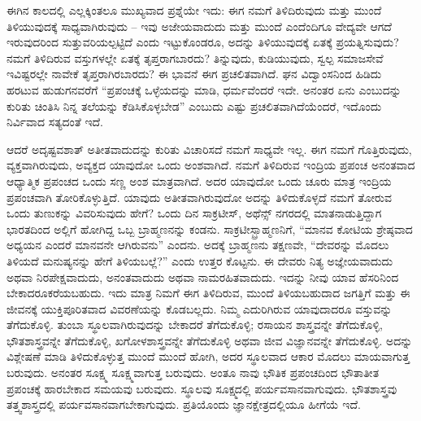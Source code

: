 ಈಗಿನ ಕಾಲದಲ್ಲಿ ಎಲ್ಲಕ್ಕಿಂತಲೂ ಮುಖ್ಯವಾದ ಪ್ರಶ್ನೆಯೇ ಇದು: ಈಗ ನಮಗೆ ತಿಳಿದಿರುವುದು ಮತ್ತು ಮುಂದೆ ತಿಳಿಯುವುದಕ್ಕೆ ಸಾಧ್ಯವಾಗಿರುವುದು – ಇವು ಅಜೇಯ\-ವಾದುದು ಮತ್ತು ಮುಂದೆ ಎಂದೆಂದಿಗೂ ವೇದ್ಯವೇ ಆಗದೆ ಇರುವುದರಿಂದ ಸುತ್ತುವರಿಯಲ್ಪಟ್ಟಿದೆ ಎಂದು ಇಟ್ಟುಕೊಂಡರೂ, ಅದನ್ನು ತಿಳಿಯುವುದಕ್ಕೆ ಏತಕ್ಕೆ ಪ್ರಯತ್ನಿಸುವುದು? ನಮಗೆ ತಿಳಿದಿರುವ ವಸ್ತುಗಳಲ್ಲೇ ಏತಕ್ಕೆ ತೃಪ್ತರಾಗಬಾರದು? ತಿನ್ನುವುದು, ಕುಡಿಯುವುದು, ಸ್ವಲ್ಪ ಸಮಾಜಸೇವೆ ಇವಿಷ್ಟರಲ್ಲೇ ನಾವೇಕೆ ತೃಪ್ತರಾಗಿರಬಾರದು? ಈ ಭಾವನೆ ಈಗ ಪ್ರಚಲಿತವಾಗಿದೆ. ಘನ ವಿದ್ವಾಂಸನಿಂದ ಹಿಡಿದು ಹರಟುವ ಹುಡುಗನವರೆಗೆ “ಪ್ರಪಂಚಕ್ಕೆ ಒಳ್ಳೆಯದನ್ನು ಮಾಡಿ, ಧರ್ಮವೆಂದರೆ ಇದೇ. ಅನಂತರ ಏನು ಎಂಬುದನ್ನು ಕುರಿತು ಚಿಂತಿಸಿ ನಿನ್ನ ತಲೆಯನ್ನು ಕೆಡಿಸಿಕೊಳ್ಳಬೇಡ” ಎಂಬುದು ಎಷ್ಟು ಪ್ರಚಲಿತವಾಗಿದೆಯೆಂದರೆ, ಇದೊಂದು ನಿರ್ವಿವಾದ ಸತ್ಯದಂತೆ ಇದೆ.

ಆದರೆ ಅದೃಷ್ಟವಶಾತ್ ಅತೀತವಾದುದನ್ನು ಕುರಿತು ವಿಚಾರಿಸದೆ ನಮಗೆ ಸಾಧ್ಯವೇ ಇಲ್ಲ. ಈಗ ನಮಗೆ ಗೊತ್ತಿರುವುದು, ವ್ಯಕ್ತವಾಗಿರುವುದು, ಅವ್ಯಕ್ತದ ಯಾವುದೋ ಒಂದು ಅಂಶವಾಗಿದೆ. ನಮಗೆ ತಿಳಿದಿರುವ ಇಂದ್ರಿಯ ಪ್ರಪಂಚ ಅನಂತವಾದ ಆಧ್ಯಾತ್ಮಿಕ ಪ್ರಪಂಚದ ಒಂದು ಸಣ್ಣ ಅಂಶ ಮಾತ್ರವಾಗಿದೆ. ಅದರ ಯಾವುದೋ ಒಂದು ಚೂರು ಮಾತ್ರ ಇಂದ್ರಿಯ ಪ್ರಪಂಚವಾಗಿ ತೋರಿಕೊಳ್ಳುತ್ತಿದೆ. ಯಾವುದು ಅತೀತವಾಗಿರುವುದೋ ಅದನ್ನು ತಿಳಿದುಕೊಳ್ಳದೆ ನಮಗೆ ತೋರುವ ಒಂದು ತುಣುಕನ್ನು ವಿವರಿಸುವುದು ಹೇಗೆ? ಒಂದು ದಿನ ಸಾಕ್ರಟೀಸ್, ಅಥೆನ್ಸ್ ನಗರದಲ್ಲಿ ಮಾತನಾಡುತ್ತಿದ್ದಾಗ ಭಾರತದಿಂದ ಅಲ್ಲಿಗೆ ಹೋಗಿದ್ದ ಒಬ್ಬ ಬ್ರಾಹ್ಮಣನನ್ನು ಕಂಡನು. ಸಾಕ್ರಟೀಸ್\break ಬ್ರಾಹ್ಮಣನಿಗೆ, “ಮಾನವ ಕೋಟಿಯ ಶ್ರೇಷ್ಠವಾದ ಅಧ್ಯಯನ ಎಂದರೆ ಮಾನವನೇ ಆಗಿರುವನು” ಎಂದನು. ಅದಕ್ಕೆ ಬ್ರಾಹ್ಮಣನು ತಕ್ಷಣವೇ, “ದೇವರನ್ನು ಮೊದಲು ತಿಳಿಯದೆ ಮನುಷ್ಯನನ್ನು ಹೇಗೆ ತಿಳಿಯಬಲ್ಲೆ?'' ಎಂದು ಉತ್ತರ ಕೊಟ್ಟನು. ಈ ದೇವರು ನಿತ್ಯ ಅಜ್ಞೇಯವಾದುದು ಅಥವಾ ನಿರಪೇಕ್ಷವಾದುದು, ಅನಂತವಾದುದು ಅಥವಾ ನಾಮರಹಿತವಾದುದು. ಇದನ್ನು ನೀವು ಯಾವ ಹೆಸರಿನಿಂದ ಬೇಕಾದರೂಕರೆಯಬಹುದು. ಇದು ಮಾತ್ರ ನಿಮಗೆ ಈಗ ತಿಳಿದಿರುವ, ಮುಂದೆ ತಿಳಿಯಬಹುದಾದ ಜಗತ್ತಿಗೆ ಮತ್ತು ಈ ಜೀವನಕ್ಕೆ ಯುಕ್ತಿಪೂರಿತವಾದ ವಿವರಣೆಯನ್ನು ಕೊಡಬಲ್ಲದು. ನಿಮ್ಮ ಎದುರಿಗಿರುವ ಯಾವುದಾದರೂ ವಸ್ತುವನ್ನು ತೆಗೆದುಕೊಳ್ಳಿ. ತುಂಬಾ ಸ್ಥೂಲವಾಗಿರುವುದನ್ನು ಬೇಕಾದರೆ ತೆಗೆದುಕೊಳ್ಳಿ; ರಸಾಯನ ಶಾಸ್ತ್ರವನ್ನೇ ತೆಗೆದುಕೊಳ್ಳಿ, ಭೌತಶಾಸ್ತ್ರವನ್ನೇ ತೆಗೆದುಕೊಳ್ಳಿ, ಖಗೋಳಶಾಸ್ತ್ರವನ್ನೇ ತೆಗೆದುಕೊಳ್ಳಿ ಅಥವಾ ಜೀವ ವಿಜ್ಞಾನವನ್ನೇ ತೆಗೆದುಕೊಳ್ಳಿ. ಅದನ್ನು ವಿಶ್ಲೇಷಣೆ ಮಾಡಿ ತಿಳಿದುಕೊಳ್ಳುತ್ತ ಮುಂದೆ ಮುಂದೆ ಹೋಗಿ, ಅದರ ಸ್ಥೂಲವಾದ ಆಕಾರ ಮೊದಲು ಮಾಯವಾಗುತ್ತ ಬರುವುದು. ಅನಂತರ ಸೂಕ್ಷ್ಮ ಸೂಕ್ಷ್ಮವಾಗುತ್ತ ಬರುವುದು. ಅಂತೂ ನಾವು ಭೌತಿಕ ಪ್ರಪಂಚದಿಂದ ಭೌತಾತೀತ ಪ್ರಪಂಚಕ್ಕೆ ಹಾರಬೇಕಾದ ಸಮಯವು ಬರುವುದು. ಸ್ಥೂಲವು ಸೂಕ್ಷ್ಮದಲ್ಲಿ ಪರ್ಯವಸಾನವಾಗುವುದು. ಭೌತಶಾಸ್ತ್ರವು ತತ್ತ್ವಶಾಸ್ತ್ರದಲ್ಲಿ ಪರ್ಯವಸಾನವಾಗಬೇಕಾಗುವುದು. ಪ್ರತಿಯೊಂದು ಜ್ಞಾನಕ್ಷೇತ್ರದಲ್ಲಿಯೂ ಹೀಗೆಯೆ ಇದೆ.


